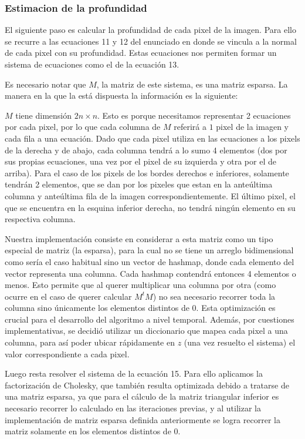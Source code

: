 \subsubsection{Estimacion de la profundidad}

El siguiente paso es calcular la profundidad de cada pixel de la imagen. Para ello se recurre a las ecuaciones 11 y 12 del enunciado en donde se vincula a la normal de cada pixel con su profundidad. Estas ecuaciones nos permiten formar un sistema de ecuaciones como el de la ecuación 13.

Es necesario notar que $M$, la matriz de este sistema, es una matriz esparsa. La manera en la que la está dispuesta la información es la siguiente:

$M$ tiene dimensión $2n \times n$. Esto es porque necesitamos representar 2 ecuaciones por cada pixel, por lo que cada columna de $M$ referirá a $1$ pixel de la imagen y cada fila a una ecuación. Dado que cada pixel utiliza en las ecuaciones a los pixels de la derecha y de abajo, cada columna tendrá a lo sumo 4 elementos (dos por sus propias ecuaciones, una vez por el pixel de su izquierda y otra por el de arriba). Para el caso de los pixels de los bordes derechos e inferiores, solamente tendrán 2 elementos, que se dan por los pixeles que estan en la anteúltima columna y anteúltima fila de la imagen correspondientemente. El último pixel, el que se encuentra en la esquina inferior derecha, no tendrá ningún elemento en su respectiva columna.

Nuestra implementación consiste en considerar a esta matriz como un tipo especial de matriz (la esparsa), para la cual no se tiene un arreglo bidimensional como sería el caso habitual sino un vector de hashmap, donde cada elemento del vector representa una columna. Cada hashmap contendrá entonces 4 elementos o menos. Esto permite que al querer multiplicar una columna por otra (como ocurre en el caso de querer calcular $M^tM$) no sea necesario recorrer toda la columna sino únicamente los elementos distintos de 0. Esta optimización es crucial para el desarrollo del algoritmo a nivel temporal. Además, por cuestiones implementativas, se decidió utilizar un diccionario que mapea cada pixel a una columna, para así poder ubicar rápidamente en $z$ (una vez resuelto el sistema) el valor correspondiente a cada pixel.

Luego resta resolver el sistema de la ecuación 15. Para ello aplicamos la factorización de Cholesky, que también resulta optimizada debido a tratarse de una matriz esparsa, ya que para el cálculo de la matriz triangular inferior es necesario recorrer lo calculado en las iteraciones previas, y al utilizar la implementación de matriz esparsa definida anteriormente se logra recorrer la matriz solamente en los elementos distintos de 0.


